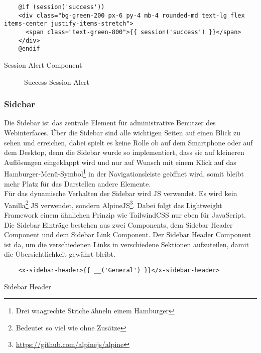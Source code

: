 \begin{listing}[H]
  \begin{verbatim}
    @if (session('success'))
    <div class="bg-green-200 px-6 py-4 mb-4 rounded-md text-lg flex items-center justify-items-stretch">
      <span class="text-green-800">{{ session('success') }}</span>
    </div>
    @endif
  \end{verbatim}
  \caption{Session Alert Component}
\end{listing}

\begin{figure}[H]
  \centering
  \caption{Success Session Alert}
\end{figure}

\subsubsection{Sidebar}
Die Sidebar ist das zentrale Element für administrative Benutzer des
Webinterfaces. Über die Sidebar sind alle wichtigen Seiten auf einen Blick zu
sehen und erreichen, dabei spielt es keine Rolle ob auf dem Smartphone oder auf
dem Desktop, denn die Sidebar wurde so implementiert, dass sie auf kleineren
Auflösungen eingeklappt wird und nur auf Wunsch mit einem Klick auf das
Hamburger-Menü-Symbol\footnote{Drei waagrechte Striche ähneln einem Hamburger}
in der Navigationsleiste geöffnet wird, somit bleibt mehr Platz für das
Darstellen andere Elemente.\\

Für das dynamische Verhalten der Sidebar wird \acl*{JS} verwendet. Es wird kein
Vanilla\footnote{Bedeutet so viel wie ohne Zusätze} \acl*{JS} verwendet, sondern
AlpineJS\footnote{\url{https://github.com/alpinejs/alpine}}. Dabei folgt das
Lightweight Framework einem ähnlichen Prinzip wie TailwindCSS nur eben für
JavaScript.\\

Die Sidebar Einträge bestehen aus zwei Components, dem Sidebar Header Component
und dem Sidebar Link Component. Der Sidebar Header Component ist da, um die verschiedenen Links in verschiedene
Sektionen aufzuteilen, damit die Übersichtlichkeit gewährt bleibt.

\begin{listing}[H]
  \begin{verbatim}
    <x-sidebar-header>{{ __('General') }}</x-sidebar-header>
  \end{verbatim}
  \caption{Sidebar Header}
\end{listing}

